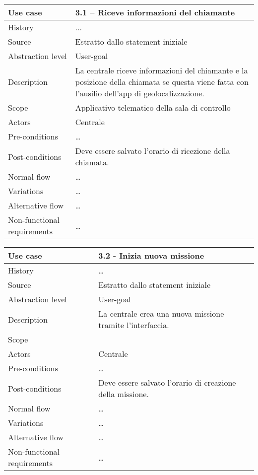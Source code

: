 \documentclass{article}
\begin{document}
    \begin{table}
        \begin{tabularx}{\textwidth}{l|X}
            Use case & 3.1 – Riceve informazioni del chiamante \\
            \hline
            History & ...                                     \\
            Source & Estratto dallo statement iniziale \\
            Abstraction level & User-goal \\
            Description & La centrale riceve informazioni del chiamante e la posizione della chiamata se questa viene fatta con l’ausilio dell’app di geolocalizzazione. \\
            Scope & Applicativo telematico della sala di controllo \\
            Actors & Centrale \\
            Pre-conditions & \dots \\
            Post-conditions & Deve essere salvato l’orario di ricezione della chiamata. \\
            Normal flow & \dots \\
            Variations & \dots \\
            Alternative flow & \dots \\
            Non-functional requirements & \dots
        \end{tabularx}
        \label{tab:usecase3.1}
    \end{table}

    \begin{table}
        \begin{tabularx}{\textwidth}{l|X}
            Use case & 3.2 - Inizia nuova missione\\
            \hline
            History & \dots \\
            Source & Estratto dallo statement iniziale\\
            Abstraction level & User-goal\\
            Description & La centrale crea una nuova missione tramite l’interfaccia.\\
            Scope & \\
            Actors & Centrale\\
            Pre-conditions & \dots \\
            Post-conditions & Deve essere salvato l’orario di creazione della missione.\\
            Normal flow & \dots \\
            Variations & \dots \\
            Alternative flow & \dots \\
            Non-functional requirements & \dots
        \end{tabularx}
        \label{tab:usecase3.2}
    \end{table}
\end{document}

